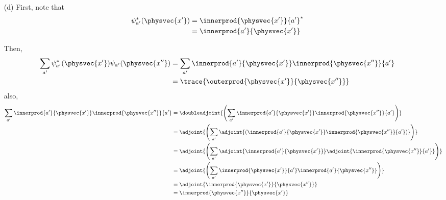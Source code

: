 \begin{itemize}
\item[(d)] First, note that
  \begin{align*}
    \psi_{a'}^*(\physvec{x'}) &= \innerprod{\physvec{x'}}{a'}^* \\
    &=
    \innerprod{a'}{\physvec{x'}}
  \end{align*}

  Then,
  \begin{align*}
    \sum_{a'}\psi_{a'}^*(\physvec{x'})\psi_{a'}(\physvec{x''})
    &=
    \sum_{a'}\innerprod{a'}{\physvec{x'}}\innerprod{\physvec{x''}}{a'} \\
    &=
    \trace{\outerprod{\physvec{x'}}{\physvec{x''}}}
  \end{align*}
  also,
  \begin{align*}
    \sum_{a'}\innerprod{a'}{\physvec{x'}}\innerprod{\physvec{x''}}{a'}
    &=
    \doubleadjoint{\left(\sum_{a'}\innerprod{a'}{\physvec{x'}}
      \innerprod{\physvec{x''}}{a'}\right)} \\
    &=
    \adjoint{\left(\sum_{a'}\adjoint{(\innerprod{a'}{\physvec{x'}}
        \innerprod{\physvec{x''}}{a'})}\right)} \\
    &=
    \adjoint{\left(\sum_{a'}\adjoint{\innerprod{a'}{\physvec{x'}}}
      \adjoint{\innerprod{\physvec{x''}}{a'}}\right)} \\
    &=
    \adjoint{\left(\sum_{a'}\innerprod{\physvec{x'}}{a'}
      \innerprod{a'}{\physvec{x''}}\right)} \\
    &=
    \adjoint{\innerprod{\physvec{x'}}{\physvec{x''}}} \\
    &=
    \innerprod{\physvec{x''}}{\physvec{x'}}
  \end{align*}
\end{itemize}
